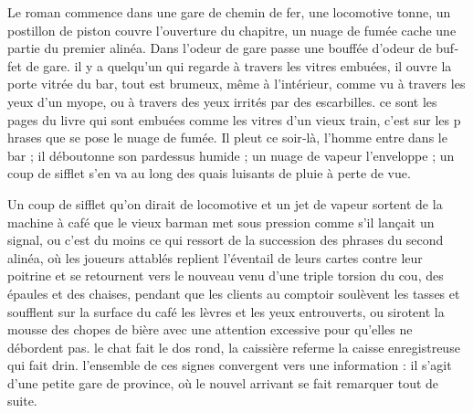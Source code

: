 \documentclass[12pt]{article}
\begin{document}
	



Le roman commence dans une gare de chemin de fer, une locomotive tonne, un postillon de piston couvre l’ouverture du chapitre, un nuage de fumée cache une partie du premier alinéa. Dans l’odeur de gare passe une bouffée d’odeur de buf‑ fet de gare. il y a quelqu’un qui regarde à travers les vitres embuées, il ouvre la porte vitrée du bar, tout est brumeux, même à l’intérieur, comme vu à travers les yeux d’un myope, ou à travers des yeux irrités par des escarbilles. ce sont les pages du livre qui sont embuées comme les vitres d’un vieux train, c’est sur les p  hrases que se pose le nuage de fumée. Il pleut ce soir‑là, l’homme entre dans le bar ; il déboutonne son pardessus humide ; un nuage de vapeur l’enveloppe ; un coup de sifflet s’en va au long des quais luisants de pluie à perte de vue. 

Un coup de sifflet qu’on dirait de locomotive et un jet de vapeur sortent de la machine à café que le vieux barman met sous pression comme s’il lançait un signal, ou c’est du moins ce qui ressort de la succession des phrases du second alinéa, où les joueurs attablés replient l’éventail de leurs cartes contre leur poitrine et se retournent vers le nouveau venu d’une triple torsion du cou, des épaules et des chaises, pendant que les clients au comptoir soulèvent les tasses et soufflent sur la surface du café les lèvres et les yeux entrouverts, ou sirotent la mousse des chopes de bière avec une attention excessive pour qu’elles ne débordent pas. le chat fait le dos rond, la caissière referme la caisse enregistreuse qui fait drin. l’ensemble de ces signes convergent vers une information : il s’agit d’une petite gare de province, où le nouvel arrivant se fait remarquer tout de suite.
\end{document}
